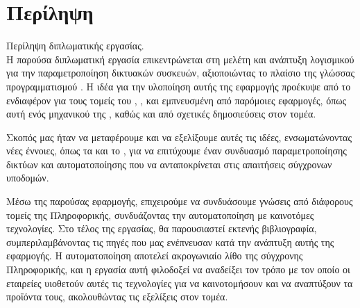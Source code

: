 \chapter*{Περίληψη}

Περίληψη διπλωματικής εργασίας.\\

\noindent Η παρούσα διπλωματική εργασία επικεντρώνεται στη μελέτη και ανάπτυξη λογισμικού για την παραμετροποίηση δικτυακών συσκευών, 
αξιοποιώντας το πλαίσιο  της γλώσσας προγραμματισμού . Η ιδέα για την υλοποίηση αυτής της εφαρμογής προέκυψε από το ενδιαφέρον 
για τους τομείς του , , και  εμπνευσμένη από παρόμοιες εφαρμογές, όπως αυτή ενός μηχανικού της , 
καθώς και από σχετικές δημοσιεύσεις στον τομέα.

Σκοπός μας ήταν να μεταφέρουμε και να εξελίξουμε αυτές τις ιδέες, ενσωματώνοντας νέες έννοιες, όπως τα  και το , 
για να επιτύχουμε έναν συνδυασμό παραμετροποίησης δικτύων και αυτοματοποίησης που να ανταποκρίνεται στις απαιτήσεις σύγχρονων υποδομών.

Μέσω της παρούσας εφαρμογής, επιχειρούμε να συνδυάσουμε γνώσεις από διάφορους τομείς της Πληροφορικής, συνδυάζοντας την αυτοματοποίηση με 
καινοτόμες τεχνολογίες. Στο τέλος της εργασίας, θα παρουσιαστεί εκτενής βιβλιογραφία, συμπεριλαμβάνοντας τις πηγές που μας ενέπνευσαν κατά την 
ανάπτυξη αυτής της εφαρμογής. Η αυτοματοποίηση αποτελεί ακρογωνιαίο λίθο της σύγχρονης Πληροφορικής, και η εργασία αυτή φιλοδοξεί να αναδείξει τον 
τρόπο με τον οποίο οι εταιρείες υιοθετούν αυτές τις τεχνολογίες για να καινοτομήσουν και να αναπτύξουν τα προϊόντα τους, ακολουθώντας τις εξελίξεις στον τομέα.